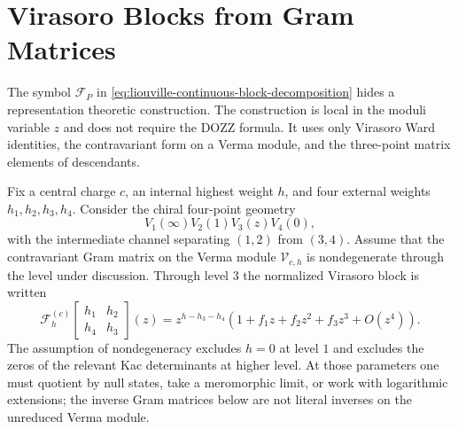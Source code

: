 \section{Virasoro Blocks from Gram Matrices}
\label{sec:liouville-virasoro-block-gram-matrices}

The symbol \(\mathcal F_P\) in
\eqref{eq:liouville-continuous-block-decomposition} hides a representation
theoretic construction.  The construction is local in the moduli variable
\(z\) and does not require the DOZZ formula.  It uses only Virasoro Ward
identities, the contravariant form on a Verma module, and the three-point
matrix elements of descendants.

\begin{definition}
\label{def:virasoro-block-coefficients}
Fix a central charge \(c\), an internal highest weight \(h\), and four
external weights \(h_1,h_2,h_3,h_4\).  Consider the chiral four-point
geometry
\[
  V_1(\infty)V_2(1)V_3(z)V_4(0),
\]
with the intermediate channel separating \((1,2)\) from \((3,4)\).  Assume
that the contravariant Gram matrix on the Verma module \(\mathcal V_{c,h}\)
is nondegenerate through the level under discussion.  Through level \(3\)
the normalized Virasoro block is written
\[
  \mathcal F_h^{(c)}
  \!\left[
    \begin{matrix}h_1&h_2\\ h_4&h_3\end{matrix}
  \right]\!(z)
  =
  z^{h-h_3-h_4}
  \left(1+f_1 z+f_2 z^2+f_3 z^3+O(z^4)\right).
\]
The assumption of nondegeneracy excludes \(h=0\) at level \(1\) and excludes
the zeros of the relevant Kac determinants at higher level.  At those
parameters one must quotient by null states, take a meromorphic limit, or
work with logarithmic extensions; the inverse Gram matrices below are not
literal inverses on the unreduced Verma module.
\end{definition}

